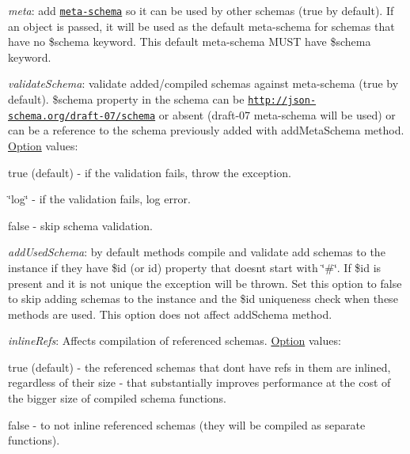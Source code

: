 \begin{DoxyItemize}
\item {\itshape meta}\+: add \href{http://json-schema.org/documentation.html}{\tt meta-\/schema} so it can be used by other schemas (true by default). If an object is passed, it will be used as the default meta-\/schema for schemas that have no {\ttfamily \$schema} keyword. This default meta-\/schema M\+U\+ST have {\ttfamily \$schema} keyword.
\item {\itshape validate\+Schema}\+: validate added/compiled schemas against meta-\/schema (true by default). {\ttfamily \$schema} property in the schema can be \href{http://json-schema.org/draft-07/schema}{\tt http\+://json-\/schema.\+org/draft-\/07/schema} or absent (draft-\/07 meta-\/schema will be used) or can be a reference to the schema previously added with {\ttfamily add\+Meta\+Schema} method. \mbox{\hyperlink{structOption}{Option}} values\+:
\begin{DoxyItemize}
\item {\ttfamily true} (default) -\/ if the validation fails, throw the exception.
\item {\ttfamily \char`\"{}log\char`\"{}} -\/ if the validation fails, log error.
\item {\ttfamily false} -\/ skip schema validation.
\end{DoxyItemize}
\item {\itshape add\+Used\+Schema}\+: by default methods {\ttfamily compile} and {\ttfamily validate} add schemas to the instance if they have {\ttfamily \$id} (or {\ttfamily id}) property that doesn\textquotesingle{}t start with \char`\"{}\#\char`\"{}. If {\ttfamily \$id} is present and it is not unique the exception will be thrown. Set this option to {\ttfamily false} to skip adding schemas to the instance and the {\ttfamily \$id} uniqueness check when these methods are used. This option does not affect {\ttfamily add\+Schema} method.
\item {\itshape inline\+Refs}\+: Affects compilation of referenced schemas. \mbox{\hyperlink{structOption}{Option}} values\+:
\begin{DoxyItemize}
\item {\ttfamily true} (default) -\/ the referenced schemas that don\textquotesingle{}t have refs in them are inlined, regardless of their size -\/ that substantially improves performance at the cost of the bigger size of compiled schema functions.
\item {\ttfamily false} -\/ to not inline referenced schemas (they will be compiled as separate functions).

\end{DoxyItemize}
\end{DoxyItemize}
